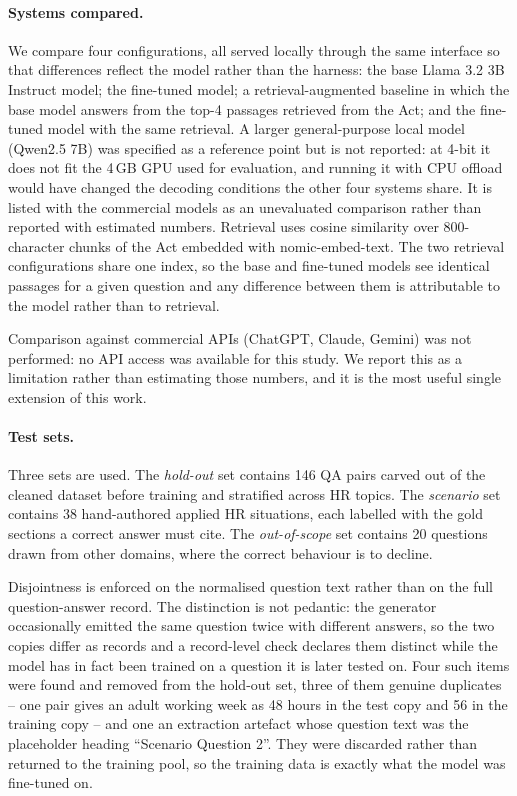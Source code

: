 \documentclass[11pt,a4paper]{article}
\begin{document}
\paragraph{Systems compared.} We compare four configurations, all served locally through the same interface so that differences reflect the model rather than the harness: the base Llama 3.2 3B Instruct model; the fine-tuned model; a retrieval-augmented\cite{ref_rag} baseline in which the base model answers from the top-4 passages retrieved from the Act; and the fine-tuned model with the same retrieval. A larger general-purpose local model (Qwen2.5 7B) was specified as a reference point but is not reported: at 4-bit it does not fit the 4\,GB GPU used for evaluation, and running it with CPU offload would have changed the decoding conditions the other four systems share. It is listed with the commercial models as an unevaluated comparison rather than reported with estimated numbers. Retrieval uses cosine similarity over 800-character chunks of the Act embedded with nomic-embed-text\cite{ref_nomic}. The two retrieval configurations share one index, so the base and fine-tuned models see identical passages for a given question and any difference between them is attributable to the model rather than to retrieval.

Comparison against commercial APIs (ChatGPT, Claude, Gemini) was not performed: no API access was available for this study. We report this as a limitation rather than estimating those numbers, and it is the most useful single extension of this work.

\paragraph{Test sets.} Three sets are used. The \emph{hold-out} set contains 146 QA pairs carved out of the cleaned dataset before training and stratified across HR topics. The \emph{scenario} set contains 38 hand-authored applied HR situations, each labelled with the gold sections a correct answer must cite. The \emph{out-of-scope} set contains 20 questions drawn from other domains, where the correct behaviour is to decline.

Disjointness is enforced on the normalised question text rather than on the full question-answer record. The distinction is not pedantic: the generator occasionally emitted the same question twice with different answers, so the two copies differ as records and a record-level check declares them distinct while the model has in fact been trained on a question it is later tested on. Four such items were found and removed from the hold-out set, three of them genuine duplicates -- one pair gives an adult working week as 48 hours in the test copy and 56 in the training copy -- and one an extraction artefact whose question text was the placeholder heading ``Scenario Question 2''. They were discarded rather than returned to the training pool, so the training data is exactly what the model was fine-tuned on.
\end{document}

